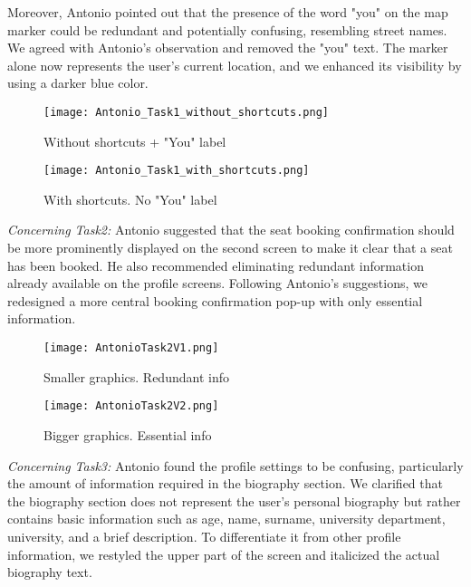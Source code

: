 \documentclass{article}
\begin{document}
Moreover, Antonio pointed out that the presence of the word "you" on the map marker could be redundant and potentially confusing, resembling street names. We agreed with Antonio's observation and removed the "you" text. The marker alone now represents the user's current location, and we enhanced its visibility by using a darker blue color.

\begin{figure}[htbp]
\centering
\begin{minipage}[t]{0.25\textwidth}
\texttt{[image: Antonio\_Task1\_without\_shortcuts.png]}
\caption{Without shortcuts + "You" label}
\end{minipage}
\hfill
\begin{minipage}[t]{0.55\textwidth}
\texttt{[image: Antonio\_Task1\_with\_shortcuts.png]}
\caption{With shortcuts. No "You" label}
\end{minipage}
\end{figure}

\newpage

\textit{Concerning Task2:} Antonio suggested that the seat booking confirmation should be more prominently displayed on the second screen to make it clear that a seat has been booked. He also recommended eliminating redundant information already available on the profile screens. Following Antonio's suggestions, we redesigned a more central booking confirmation pop-up with only essential information.

\begin{figure}[htbp]
\centering
\begin{minipage}[t]{0.25\textwidth}
\texttt{[image: AntonioTask2V1.png]}
\caption{Smaller graphics. Redundant info}
\end{minipage}
\hfill
\begin{minipage}[t]{0.25\textwidth}
\texttt{[image: AntonioTask2V2.png]}
\caption{Bigger graphics. Essential info}
\end{minipage}
\end{figure}

\newpage

\textit{Concerning Task3:} Antonio found the profile settings to be confusing, particularly the amount of information required in the biography section. We clarified that the biography section does not represent the user's personal biography but rather contains basic information such as age, name, surname, university department, university, and a brief description. To differentiate it from other profile information, we restyled the upper part of the screen and italicized the actual biography text.
\end{document}
